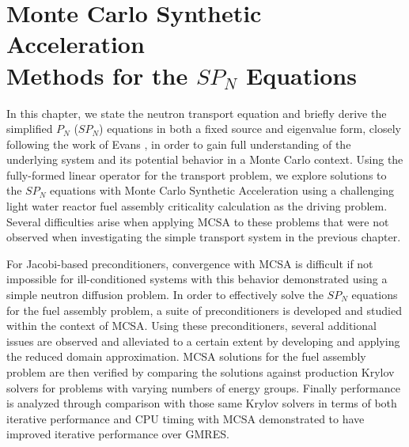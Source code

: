 \chapter{Monte Carlo Synthetic Acceleration\\ Methods for the $SP_N$ Equations}
\label{ch:spn_equations}

In this chapter, we state the neutron transport equation and briefly
derive the simplified $P_N$ ($SP_N$) equations in both a fixed source
and eigenvalue form, closely following the work of Evans
\cite{evans_simplified_2013}, in order to gain full understanding of
the underlying system and its potential behavior in a Monte Carlo
context. Using the fully-formed linear operator for the transport
problem, we explore solutions to the $SP_N$ equations with Monte Carlo
Synthetic Acceleration using a challenging light water reactor fuel
assembly criticality calculation as the driving problem. Several
difficulties arise when applying MCSA to these problems that were not
observed when investigating the simple transport system in the
previous chapter.

For Jacobi-based preconditioners, convergence with MCSA is difficult
if not impossible for ill-conditioned systems with this behavior
demonstrated using a simple neutron diffusion problem. In order to
effectively solve the $SP_N$ equations for the fuel assembly problem,
a suite of preconditioners is developed and studied within the context
of MCSA. Using these preconditioners, several additional issues are
observed and alleviated to a certain extent by developing and applying
the reduced domain approximation. MCSA solutions for the fuel assembly
problem are then verified by comparing the solutions against
production Krylov solvers for problems with varying numbers of energy
groups. Finally performance is analyzed through comparison with those
same Krylov solvers in terms of both iterative performance and CPU
timing with MCSA demonstrated to have improved iterative performance
over GMRES.

